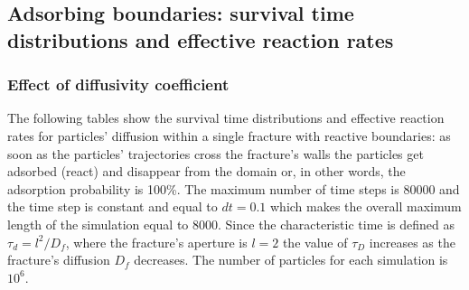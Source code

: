 \documentclass{article}
\begin{document}
\FloatBarrier  %
\subsection{Adsorbing boundaries: survival time distributions and effective reaction rates}
\subsubsection{Effect of diffusivity coefficient}
The following tables show the survival time distributions and effective reaction rates for particles' diffusion within a single fracture with reactive boundaries: as soon as the particles' trajectories cross the fracture's walls the particles get adsorbed (react) and disappear from the domain or, in other words, the adsorption probability is 100\%. The maximum number of time steps is 80000 and the time step is constant and equal to $dt=0.1$ which makes the overall maximum length of the simulation equal to 8000. Since the characteristic time is defined as $\tau_d=l^2/D_f$, where the fracture's aperture is $l=2$ the value of $\tau_D$ increases as the fracture's diffusion $D_f$ decreases. The number of particles for each simulation is $10^6$.
\end{document}
